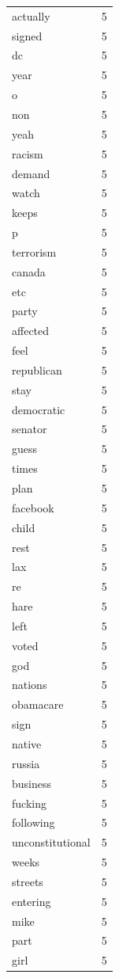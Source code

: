 \begin{tabular}{lr}
actually & 5 \\
signed & 5 \\
dc & 5 \\
year & 5 \\
o & 5 \\
non & 5 \\
yeah & 5 \\
racism & 5 \\
demand & 5 \\
watch & 5 \\
keeps & 5 \\
p & 5 \\
terrorism & 5 \\
canada & 5 \\
etc & 5 \\
party & 5 \\
affected & 5 \\
feel & 5 \\
republican & 5 \\
stay & 5 \\
democratic & 5 \\
senator & 5 \\
guess & 5 \\
times & 5 \\
plan & 5 \\
facebook & 5 \\
child & 5 \\
rest & 5 \\
lax & 5 \\
re & 5 \\
hare & 5 \\
left & 5 \\
voted & 5 \\
god & 5 \\
nations & 5 \\
obamacare & 5 \\
sign & 5 \\
native & 5 \\
russia & 5 \\
business & 5 \\
fucking & 5 \\
following & 5 \\
unconstitutional & 5 \\
weeks & 5 \\
streets & 5 \\
entering & 5 \\
mike & 5 \\
part & 5 \\
girl & 5 \\

\end{tabular}
